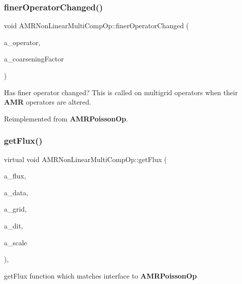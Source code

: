 \subsubsection{\texorpdfstring{finer\+Operator\+Changed()}{finerOperatorChanged()}}
{\footnotesize\ttfamily void A\+M\+R\+Non\+Linear\+Multi\+Comp\+Op\+::finer\+Operator\+Changed (\begin{DoxyParamCaption}\item[{const \textbf{ M\+G\+Level\+Op}$<$ \textbf{ Level\+Data}$<$ \textbf{ F\+Array\+Box} $>$ $>$ \&}]{a\+\_\+operator,  }\item[{int}]{a\+\_\+coarsening\+Factor }\end{DoxyParamCaption})\hspace{0.3cm}{\ttfamily [virtual]}}

Has finer operator changed? This is called on multigrid operators when their \textbf{ A\+MR} operators are altered. 

Reimplemented from \textbf{ A\+M\+R\+Poisson\+Op}.

\mbox{\label{class_a_m_r_non_linear_multi_comp_op_a348203bd1783a1ce09fb8dbf876d79ae}} 
\subsubsection{\texorpdfstring{get\+Flux()}{getFlux()}}
{\footnotesize\ttfamily virtual void A\+M\+R\+Non\+Linear\+Multi\+Comp\+Op\+::get\+Flux (\begin{DoxyParamCaption}\item[{\textbf{ Flux\+Box} \&}]{a\+\_\+flux,  }\item[{const \textbf{ Level\+Data}$<$ \textbf{ F\+Array\+Box} $>$ \&}]{a\+\_\+data,  }\item[{const \textbf{ Box} \&}]{a\+\_\+grid,  }\item[{const \textbf{ Data\+Index} \&}]{a\+\_\+dit,  }\item[{\textbf{ Real}}]{a\+\_\+scale }\end{DoxyParamCaption})\hspace{0.3cm}{\ttfamily [inline]}, {\ttfamily [virtual]}}



get\+Flux function which matches interface to \textbf{ A\+M\+R\+Poisson\+Op} 


